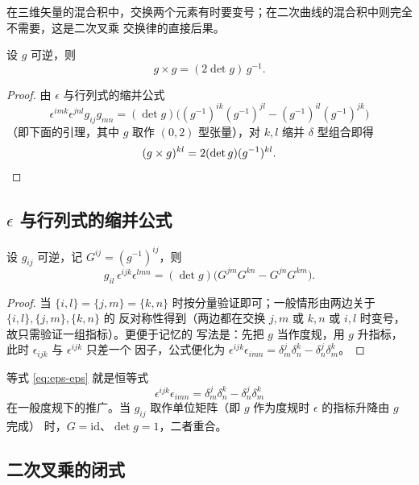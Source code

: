 在三维矢量的混合积中，交换两个元素有时要变号；在二次曲线的混合积中则完全不需要，这是二次叉乘
交换律的直接后果。

\begin{proposition}
设 $g$ 可逆，则
\[
g\times g=(2\det g)\,g^{-1}.
\]
\end{proposition}

\begin{proof}
由 $\epsilon$ 与行列式的缩并公式
\[
\epsilon^{imk}\epsilon^{jnl}g_{ij}g_{mn}
=(\det g)\big((g^{-1})^{ik}(g^{-1})^{jl}-(g^{-1})^{il}(g^{-1})^{jk}\big)
\]
（即下面的引理，其中 $g$ 取作 $(0,2)$ 型张量），对 $k,l$ 缩并 $\delta$ 型组合即得
\[
(g\times g)^{kl}=2(\det g)(g^{-1})^{kl}.\qedhere
\]
\end{proof}

\subsection{$\epsilon$ 与行列式的缩并公式}

\begin{lemma}
\label{lem:eps}
设 $g_{ij}$ 可逆，记 $G^{ij}=(g^{-1})^{ij}$，则
\begin{equation}
\label{eq:eps-eps}
g_{il}\,\epsilon^{ijk}\epsilon^{lmn}
=(\det g)\big(G^{jm}G^{kn}-G^{jn}G^{km}\big).
\end{equation}
\end{lemma}

\begin{proof}
当 $\{i,l\}=\{j,m\}=\{k,n\}$ 时按分量验证即可；一般情形由两边关于 $\{i,l\},\{j,m\},\{k,n\}$ 的
反对称性得到（两边都在交换 $j,m$ 或 $k,n$ 或 $i,l$ 时变号，故只需验证一组指标）。更便于记忆的
写法是：先把 $g$ 当作度规，用 $g$ 升指标，此时 $\epsilon_{ijk}$ 与 $\epsilon^{ijk}$ 只差一个
因子，公式便化为 $\epsilon^{ijk}\epsilon_{imn}=\delta^j_m\delta^k_n-\delta^j_n\delta^k_m$。
\end{proof}

\begin{remark}
等式 \eqref{eq:eps-eps} 就是恒等式
\[
\epsilon^{ijk}\epsilon_{imn}=\delta^j_m\delta^k_n-\delta^j_n\delta^k_m
\]
在一般度规下的推广。当 $g_{ij}$ 取作单位矩阵（即 $g$ 作为度规时 $\epsilon$ 的指标升降由 $g$ 完成）
时，$G=\mathrm{id}$、$\det g=1$，二者重合。
\end{remark}

\subsection{二次叉乘的闭式}


